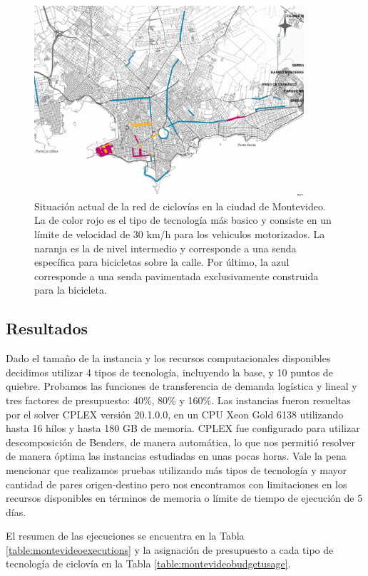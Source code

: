 \begin{figure}[h!]
  \centering
  \includegraphics[width=10cm]{../resources/bicicircuitos_montevideo.png}
  \caption{Situación actual de la red de ciclovías en la ciudad de Montevideo. La de color rojo es el tipo de tecnología más basico y consiste en un límite de velocidad de 30 km/h para los vehiculos motorizados. La naranja es la de nivel intermedio y corresponde a una senda específica para bicicletas sobre la calle. Por último, la azul corresponde a una senda pavimentada exclusivamente construida para la bicicleta.}
  \label{fig:montevideobikeways}
\end{figure}

\subsection{Resultados}

Dado el tamaño de la instancia y los recursos computacionales disponibles decidimos utilizar 4 tipos de tecnología, incluyendo la base, y 10 puntos de quiebre. Probamos las funciones de transferencia de demanda logística y lineal y tres factores de presupuesto: 40\%, 80\% y 160\%. Las instancias fueron resueltas por el solver CPLEX versión 20.1.0.0, en un CPU Xeon Gold 6138 utilizando hasta 16 hilos y hasta 180 GB de memoria. CPLEX fue configurado para utilizar descomposición de Benders, de manera automática, lo que nos permitió resolver de manera óptima las instancias estudiadas en unas pocas horas. Vale la pena mencionar que realizamos pruebas utilizando más tipos de tecnología y mayor cantidad de pares origen-destino pero nos encontramos con limitaciones en los recursos disponibles en términos de memoria o límite de tiempo de ejecución de 5 días.

El resumen de las ejecuciones se encuentra en la Tabla \ref{table:montevideoexecutions} y la asignación de presupuesto a cada tipo de tecnología de ciclovía en la Tabla \ref{table:montevideobudgetusage}.

